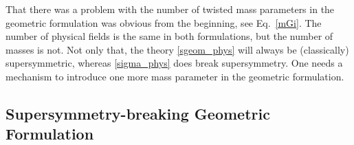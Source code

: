 \documentclass[12pt]{article}
\begin{document}
	That there was a problem with the number of twisted mass parameters in the geometric formulation 
	was obvious from the beginning, see Eq.~\eqref{mGi}.
	The number of physical fields is the same in both formulations, but the number of masses is not.
	Not only that, the theory \eqref{sgeom_phys} will always be (classically) supersymmetric, whereas
	\eqref{sigma_phys} does break supersymmetry.
	One needs a mechanism to introduce one more mass parameter in the geometric formulation.

\subsection{Supersymmetry-breaking Geometric Formulation}
\label{sbreaking}
\end{document}
